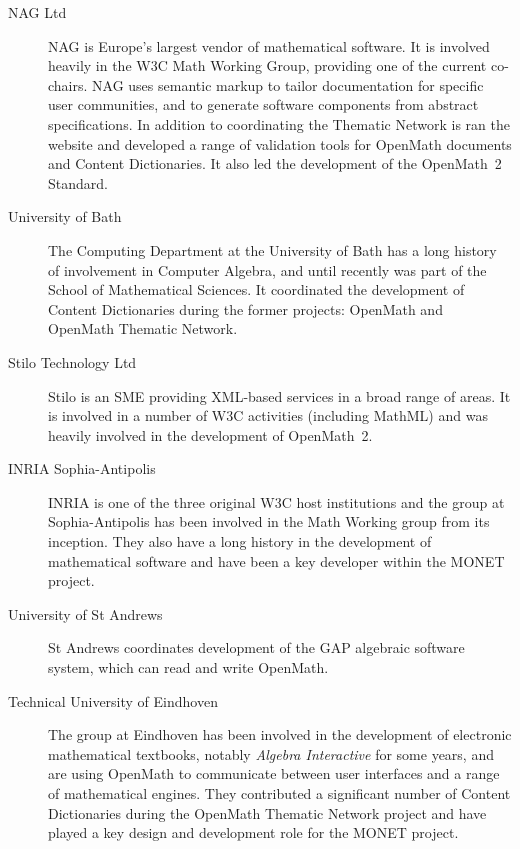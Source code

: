 \documentclass{euproposal}
\begin{document}
\begin{description}
  
\item[NAG Ltd] NAG is Europe's largest vendor of mathematical
  software.  It is involved heavily in the W3C Math Working Group,
  providing one of the current co-chairs.  NAG uses semantic markup to
  tailor documentation for specific user communities, and to generate
  software components from abstract specifications.  In addition to
  coordinating the Thematic Network is ran the website and developed a
  range of validation tools for OpenMath documents and Content
  Dictionaries.  It also led the development of the OpenMath~2
  Standard.
  
\item[University of Bath] The Computing Department at the University
  of Bath has a long history of involvement in Computer Algebra, and
  until recently was part of the School of Mathematical Sciences.  It
  coordinated the development of Content Dictionaries during the
  former projects: OpenMath and OpenMath Thematic Network.
  
\item[Stilo Technology Ltd] Stilo is an SME providing XML-based
  services in a broad range of areas.  It is involved in a number of
  W3C activities (including MathML) and was heavily involved in the
  development of OpenMath~2.
  
\item[INRIA Sophia-Antipolis] INRIA is one of the three original W3C
  host institutions and the group at Sophia-Antipolis has been
  involved in the Math Working group from its inception.  They also
  have a long history in the development of mathematical software and
  have been a key developer within the MONET project.
  
\item[University of St Andrews] St Andrews coordinates development of
  the GAP algebraic software system, which can read and write
  OpenMath.
  
\item[Technical University of Eindhoven] The group at Eindhoven has
  been involved in the development of electronic mathematical
  textbooks, notably \emph{Algebra Interactive} for some years, and
  are using OpenMath to communicate between user interfaces and a
  range of mathematical engines.  They contributed a significant
  number of Content Dictionaries during the OpenMath Thematic Network
  project and have played a key design and development role for the
  MONET project. 
  

\end{description}
\end{document}

